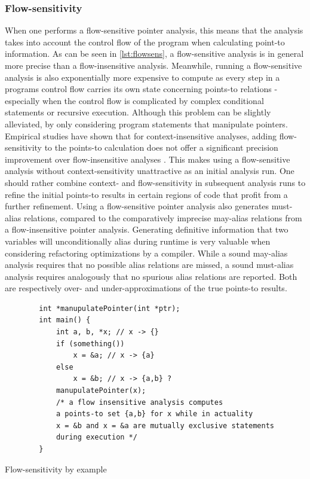 \subsubsection{Flow-sensitivity}
When one performs a flow-sensitive pointer analysis, this means that the analysis takes into account the control flow of the program when calculating point-to information.
As can be seen in \autoref{lst:flowsens}, a flow-sensitive analysis is in general more precise than a flow-insensitive analysis. Meanwhile, running a flow-sensitive analysis is also exponentially more expensive to compute as every step in a programs control flow carries its own state concerning points-to relations - especially when the control flow is complicated by complex conditional statements or recursive execution.
Although this problem can be slightly alleviated, by only considering program statements that manipulate pointers.
Empirical studies have shown that for context-insensitive analyses, adding flow-sensitivity to the points-to calculation does not offer a significant precision improvement over flow-insensitive analyses \cite{hind2001pointer}. This makes using a flow-sensitive analysis without context-sensitivity unattractive as an initial analysis run. One should rather combine context- and flow-sensitivity in subsequent analysis runs to refine the initial points-to results in certain regions of code that profit from a further refinement.
Using a flow-sensitive pointer analysis also generates must-alias relations, compared to the comparatively imprecise may-alias relations from a flow-insensitive pointer analysis.
Generating definitive information that two variables will unconditionally alias during runtime is very valuable when considering refactoring optimizations by a compiler.
While a sound may-alias analysis requires that no possible alias relations are missed, a sound must-alias analysis requires analogously that no spurious alias relations are reported. Both are respectively over- and under-approximations of the true points-to results.

\begin{listing}
    \begin{verbatim}
        int *manupulatePointer(int *ptr);
        int main() {
            int a, b, *x; // x -> {}
            if (something())
                x = &a; // x -> {a}
            else
                x = &b; // x -> {a,b} ?
            manupulatePointer(x);
            /* a flow insensitive analysis computes 
            a points-to set {a,b} for x while in actuality 
            x = &b and x = &a are mutually exclusive statements
            during execution */
        }
    \end{verbatim}
    \caption{Flow-sensitivity by example}
    \label{lst:flowsens}
\end{listing}

